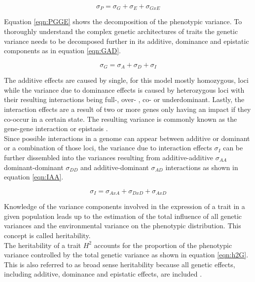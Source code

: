 \begin{equation}
 \sigma_{P} = \sigma_{G} + \sigma_{E} + \sigma_{GxE}
 \label{eqn:PGGE}
\end{equation}

Equation \ref{eqn:PGGE} shows the decomposition of the phenotypic variance. To thoroughly
understand the complex genetic architectures of traits the genetic variance needs to be
decomposed further in its additive, dominance and epistatic components as in equation
\ref{eqn:GAD}.

\begin{equation}
 \sigma_{G} = \sigma_{A} + \sigma_{D} + \sigma_{I}
 \label{eqn:GAD}
\end{equation}

The additive effects are caused by single, for this model mostly homozygous, loci while
the variance due to dominance effects is caused by heterozygous loci with their
resulting interactions being full-, over- , co- or underdominant. Lastly, the interaction
effects are a result of two or more genes only having an impact if they co-occur in a
certain state. The resulting variance is commonly known as the gene-gene interaction or epistasis \cite{falconer1996}. \\
Since possible interactions in a genome can appear between additive or dominant or a
combination of those loci, the variance due to interaction effects $\sigma_{I}$ can be
further dissembled into the variances resulting from additive-additive $\sigma_{AA}$
dominant-dominant $\sigma_{DD}$ and additive-dominant $\sigma_{AD}$ interactions as shown
in equation \ref{eqn:IAA}.

\begin{equation}
 \sigma_{I} = \sigma_{AxA} + \sigma_{DxD} + \sigma_{AxD}
 \label{eqn:IAA}
\end{equation}

Knowledge of the variance components involved in the expression of a trait in a given
population leads up to the estimation of the total influence of all genetic variances and
the environmental variance on the phenotypic distribution. This concept is called
heritability. \\
The heritability of a trait $H^2$ accounts for the proportion of the phenotypic variance
controlled by the total genetic variance as shown in equation \ref{eqn:h2G}. This is also
referred to as broad sense heritability because all genetic effects, including additive,
dominance and epistatic effects, are included \cite{brooker1999genetics}.

